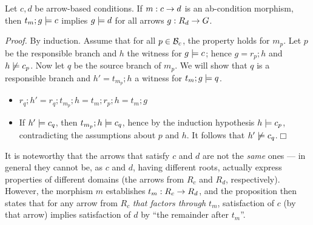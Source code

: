 \begin{proposition}
Let $c,d$ be arrow-based conditions. If $m:c\rightarrow d$ is an ab-condition morphism, then $t_m;g\models c$ implies $g \models d$ for all arrows $g:R_d\rightarrow G$.
\end{proposition}
%
\emph{Proof.} By induction. Assume that for all $p\in \mathcal{B}_c$, the property holds for $m_p$. Let $p$ be the responsible branch and $h$ the witness for $g\models c$; hence $g=r_p;h$ and $h\not\models c_p$. Now let $q$ be the source branch of $m_p$. We will show that $q$ is a responsible branch and $h'=t_{m_p};h$ a witness for $t_m;g\models q$.
\begin{itemize}
\item $r_q;h'=r_q;t_{m_p};h=t_m;r_p;h=t_m;g$
\item If $h'\models c_q$, then $t_{m_p};h\models c_q$, hence by the induction hypothesis $h\models c_p$, contradicting the assumptions about $p$ and $h$. It follows that $h'\not\models c_q$.\hfill$\Box$
\end{itemize}
%
It is noteworthy that the arrows that satisfy $c$ and $d$ are not the \emph{same} ones --- in general they cannot be, as $c$ and $d$, having different roots, actually express properties of different domains (the arrows from $R_c$ and $R_d$, respectively). However, the morphism $m$ establishes $t_m:R_c\rightarrow R_d$, and the proposition then states that for any arrow from $R_c$ \emph{that factors through $t_m$}, satisfaction of $c$ (by that arrow) implies satisfaction of $d$ by ``the remainder after $t_m$''.

